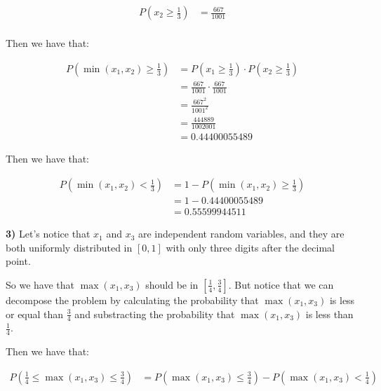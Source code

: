 \begin{equation*}
    \begin{split}
        P(x_2 \geq \frac{1}{3}) & = \frac{667}{1001} \\
    \end{split}
\end{equation*}

Then we have that:

\begin{equation*}
    \begin{split}
        P(\min(x_1, x_2) \geq \frac{1}{3}) & = P(x_1 \geq \frac{1}{3}) \cdot P(x_2 \geq \frac{1}{3}) \\
                                           & = \frac{667}{1001} \cdot \frac{667}{1001}               \\
                                           & = \frac{667^2}{1001^2}                                  \\
                                           & = \frac{444889}{1002001}                                \\
                                           & = 0.44400055489
    \end{split}
\end{equation*}

Then we have that:

\begin{equation*}
    \begin{split}
        P(\min(x_1, x_2) < \frac{1}{3}) & = 1 - P(\min(x_1, x_2) \geq \frac{1}{3}) \\
                                        & = 1 - 0.44400055489                      \\
                                        & = 0.55599944511
    \end{split}
\end{equation*}

\textbf{3)} Let's notice that $x_1$ and $x_3$ are independent
random variables, and they are both uniformly distributed in $[0,1]$
with only three digits after the decimal point.

So we have that $\max(x_1, x_3)$ should be in $[ \frac{1}{4}, \frac{3}{4} ]$.
But notice that we can decompose the problem by calculating the
probability that $\max(x_1, x_3)$ is less or equal than $\frac{3}{4}$ and
substracting the probability that $\max(x_1, x_3)$ is less than
$\frac{1}{4}$.

Then we have that:

\begin{equation*}
    \begin{split}
        P(\frac{1}{4}\leq\max(x_1, x_3)\leq\frac{3}{4}) & = P(\max(x_1, x_3) \leq \frac{3}{4}) - P(\max(x_1, x_3) < \frac{1}{4}) \\
    \end{split}
\end{equation*}

